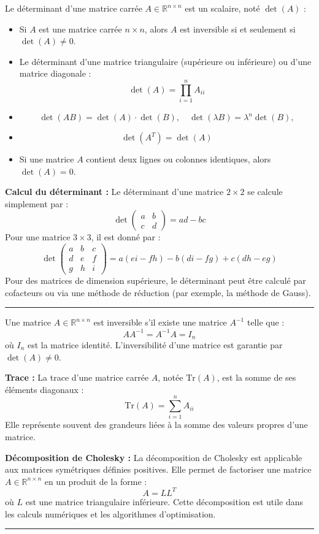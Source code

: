 \begin{f}
  
Le déterminant d'une matrice carrée \( A \in \mathbb{R}^{n \times n} \) est un scalaire, noté \( \det(A) \) :
\begin{itemize}
    \item Si \( A \) est une matrice carrée \( n \times n \), alors \( A \) est inversible si et seulement si \( \det(A) \neq 0 \).
    \item Le déterminant d'une matrice triangulaire (supérieure ou inférieure) ou d'une matrice diagonale :
    \[
    \det(A) = \prod_{i=1}^{n} A_{ii}
    \]
    \item
    \[
    \det(AB) = \det(A) \cdot \det(B),\quad \det(\lambda B) = \lambda^n\det(B), 
    \]
    \item 
    \[
    \det(A^T) = \det(A)
    \]
    \item Si une matrice \( A \) contient deux lignes ou colonnes identiques, alors \( \det(A) = 0 \).
\end{itemize}

\textbf{Calcul du déterminant :}
Le déterminant d'une matrice \( 2 \times 2 \) se calcule simplement par :
\[
\det\begin{pmatrix} a & b \\ c & d \end{pmatrix} = ad - bc
\]
Pour une matrice \( 3 \times 3 \), il est donné par :
\[
\det\begin{pmatrix} a & b & c \\ d & e & f \\ g & h & i \end{pmatrix} = a(ei - fh) - b(di - fg) + c(dh - eg)
\]
Pour des matrices de dimension supérieure, le déterminant peut être calculé par cofacteurs ou via une méthode de réduction (par exemple, la méthode de Gauss).

\end{f}
\hrule
\begin{f} 
Une matrice \( A \in \mathbb{R}^{n \times n} \) est inversible s'il existe une matrice \( A^{-1} \) telle que :
\[
A A^{-1} = A^{-1} A = I_n
\]
où \( I_n \) est la matrice identité. L'inversibilité d'une matrice est garantie par \( \det(A) \neq 0 \).

\textbf{Trace :}
La trace d'une matrice carrée \( A \), notée \( \text{Tr}(A) \), est la somme de ses éléments diagonaux :
\[
\text{Tr}(A) = \sum_{i=1}^{n} A_{ii}
\]
Elle représente souvent des grandeurs liées à la somme des valeurs propres d'une matrice.

\textbf{Décomposition de Cholesky :}
La décomposition de Cholesky est applicable aux matrices symétriques définies positives. Elle permet de factoriser une matrice \( A \in \mathbb{R}^{n \times n} \) en un produit de la forme :
\[
A = LL^T
\]
où \( L \) est une matrice triangulaire inférieure. Cette décomposition est utile dans les calculs numériques et les algorithmes d'optimisation.

\end{f}
\hrule

